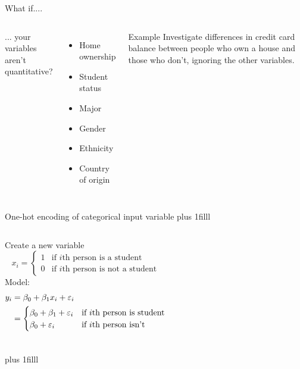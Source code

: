 \documentclass[aspectratio=169,usenames,dvipsnames]{beamer}
\newcommand{\InstructorNotes}[1]{\textit{\color{orange}#1}}
\newcommand{\InstructorList}[1]{
\begin{itemize}
	\color{orange}
	#1
\end{itemize}
}
\renewcommand{\InstructorNotes}[1]{}
\renewcommand{\InstructorList}[1]{}
\newcommand{\bvfill}{\vskip0pt plus 1filll}
\begin{document}
	\begin{frame}[c]{What if....}
	\InstructorNotes{Copied from day 7 b/c out of time. can comment out!}
	\begin{columns}
	\centering
	... your variables aren't quantitative?
	
	\begin{itemize}
		\item Home ownership
		\item Student status
		\item Major
		\item Gender
		\item Ethnicity
		\item Country of origin
	\end{itemize}
	\centering
	\begin{block}{Example}
	Investigate differences in credit card balance between people who own a house and those who don't, ignoring the other variables.
	\end{block}
	
	\end{columns}
	
	\end{frame}
	\begin{frame}[t]{One-hot encoding of categorical input variable }
	\bvfill
	\begin{columns}
	\column{.6\textwidth}
	Create a new variable
	\begin{equation*}
			x_i =
		\begin{cases}
			1 & \text{if $i$th person is a student}\\
			0 & \text{if $i$th person is not a student}
		\end{cases}
	\end{equation*}
	Model:
	\begin{align*}
	y_i &= \beta_0 + \beta_1x_i+\varepsilon_i\\
	&= 
		\begin{cases}
			\beta_0 + \beta_1+\varepsilon_i	 & \text{if $i$th person is student}\\
			\beta_0 +\varepsilon_i & \text{if $i$th person isn't}
		\end{cases}
	\end{align*}
	\column{.35\textwidth}
	\tiny
	\InstructorList{
	\item this is often called a dummy variable
	\item $\beta_0$ is avg credit card balance among those who are not a student 
	\item $\beta_0 + \beta_1$ is the avg for those are
	\item $\beta_1$ is avg diff in balance
	}
	\end{columns}
	\bvfill
	\end{frame}
\end{document}
